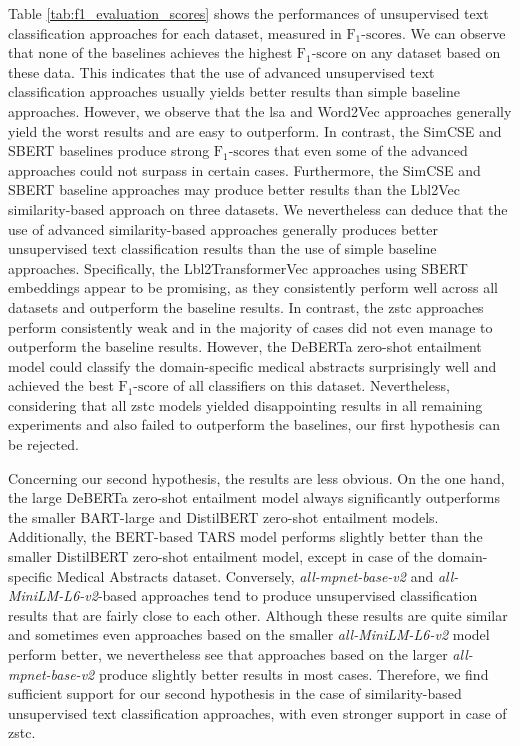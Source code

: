\documentclass[sigconf]{acmart}
\begin{document}
Table \ref{tab:f1_evaluation_scores} shows the performances of unsupervised text classification approaches for each dataset, measured in $\text{F}_{1}\text{-scores}$. We can observe that none of the baselines achieves the highest $\text{F}_{1}\text{-score}$ on any dataset based on these data. This indicates that the use of advanced unsupervised text classification approaches usually yields better results than simple baseline approaches. However, we observe that the \ac{lsa} and Word2Vec approaches generally yield the worst results and are easy to outperform. In contrast, the SimCSE and SBERT baselines produce strong $\text{F}_{1}\text{-scores}$ that even some of the advanced approaches could not surpass in certain cases. Furthermore, the SimCSE and SBERT baseline approaches may produce better results than the Lbl2Vec similarity-based approach on three datasets. We nevertheless can deduce that the use of advanced similarity-based approaches generally produces better unsupervised text classification results than the use of simple baseline approaches. Specifically, the Lbl2TransformerVec approaches using SBERT embeddings appear to be promising, as they consistently perform well across all datasets and outperform the baseline results. In contrast, the \ac{zstc} approaches perform consistently weak and in the majority of cases did not even manage to outperform the baseline results. However, the DeBERTa zero-shot entailment model could classify the domain-specific medical abstracts surprisingly well and achieved the best $\text{F}_{1}\text{-score}$ of all classifiers on this dataset. Nevertheless, considering that all \ac{zstc} models yielded disappointing results in all remaining experiments and also failed to outperform the baselines, our first hypothesis can be rejected. 


Concerning our second hypothesis, the results are less obvious. On the one hand, the large DeBERTa zero-shot entailment model always significantly outperforms the smaller BART-large and DistilBERT zero-shot entailment models. Additionally, the BERT-based TARS model performs slightly better than the smaller DistilBERT zero-shot entailment model, except in case of the domain-specific Medical Abstracts dataset. Conversely, \textit{all-mpnet-base-v2} and \textit{all-MiniLM-L6-v2}-based approaches tend to produce unsupervised classification results that are fairly close to each other. Although these results are quite similar and sometimes even approaches based on the smaller \textit{all-MiniLM-L6-v2} model perform better, we nevertheless see that approaches based on the larger \textit{all-mpnet-base-v2} produce slightly better results in most cases. Therefore, we find sufficient support for our second hypothesis in the case of similarity-based unsupervised text classification approaches, with even stronger support in case of \ac{zstc}.
\end{document}
